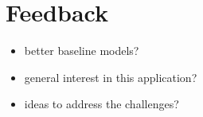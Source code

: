 \documentclass[a0]{tumposter}
\begin{document}
\begin{minipage}[t]{0.32\textwidth}
	 
	 \section{Feedback}
	 
	 \begin{itemize}
	 	\item better baseline models?
	 	\item general interest in this application?
	 	\item ideas to address the challenges?
	 \end{itemize}

	\tiny
	
	

\end{minipage}
\end{document}
